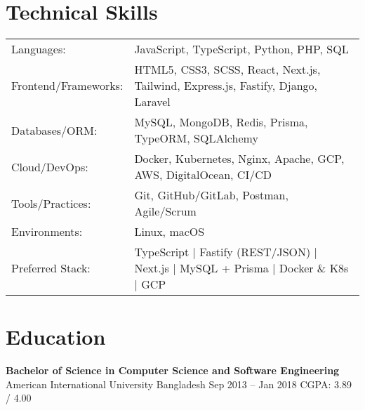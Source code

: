 \documentclass[a4paper,10pt]{article}
\begin{document}
\section*{Technical Skills}
\begin{tabular}{@{}ll}
Languages: & JavaScript, TypeScript, Python, PHP, SQL \\
Frontend/Frameworks: & HTML5, CSS3, SCSS, React, Next.js, Tailwind, Express.js, Fastify, Django, Laravel \\
Databases/ORM: & MySQL, MongoDB, Redis, Prisma, TypeORM, SQLAlchemy \\
Cloud/DevOps: & Docker, Kubernetes, Nginx, Apache, GCP, AWS, DigitalOcean, CI/CD \\
Tools/Practices: & Git, GitHub/GitLab, Postman, Agile/Scrum \\
Environments: & Linux, macOS \\
Preferred Stack: & TypeScript | Fastify (REST/JSON) | Next.js | MySQL + Prisma | Docker \& K8s | GCP \\
\end{tabular}

\section*{Education}
\textbf{Bachelor of Science in Computer Science and Software Engineering}\\
American International University Bangladesh \hfill Sep 2013 -- Jan 2018 \hspace{1em} CGPA: 3.89 / 4.00
\end{document}
